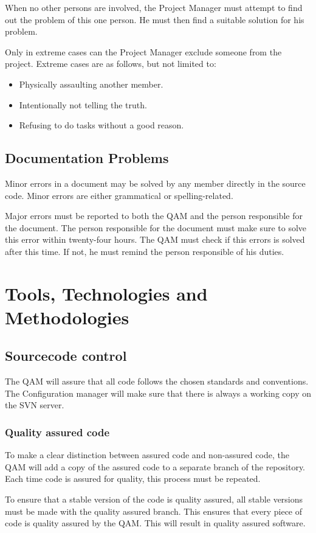 \documentclass[salesmen, twoside]{../../../templates/latex/2009/softproj}
\begin{document}
\begin{projdoc}
When no other persons are involved, the Project Manager must attempt to find out the problem of this one person. He must then find a suitable solution for his problem.

Only in extreme cases can the Project Manager exclude someone from the project. Extreme cases are as follows, but not limited to:
\begin{itemize}
\item
Physically assaulting another member.
\item
Intentionally not telling the truth.
\item
Refusing to do tasks without a good reason.
\end{itemize}

\section{Documentation Problems}
Minor errors in a document may be solved by any member directly in the source code. Minor errors are either grammatical or spelling-related.

Major errors must be reported to both the QAM and the person responsible for the document. The person responsible for the document must make sure to solve this error within twenty-four hours. The QAM must check if this errors is solved after this time. If not, he must remind the person responsible of his duties.

\chapter{Tools, Technologies and Methodologies}
\section{Sourcecode control}
The QAM will assure that all code follows the chosen standards and conventions. The Configuration manager will make sure that there is always a working copy on the SVN server.

\subsection{Quality assured code}
To make a clear distinction between assured code and non-assured code, the QAM will add a copy of the assured code to a separate branch of the repository. Each time code is assured for quality, this process must be repeated.

To ensure that a stable version of the code is quality assured, all stable versions must be made with the quality assured branch. This ensures that every piece of code is quality assured by the QAM. This will result in quality assured software.


\end{projdoc}
\end{document}

